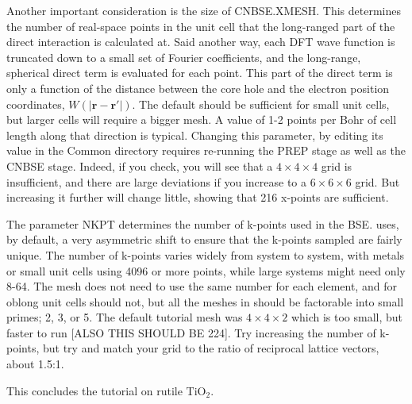 \documentclass[11pt]{report}
\begin{document}
Another important consideration is the size of CNBSE.XMESH. This determines the number of real-space points in the unit cell that the long-ranged part of the direct interaction is calculated at. Said another way, each DFT wave function is truncated down to a small set of Fourier coefficients, and the long-range, spherical direct term is evaluated for each point. This part of the direct term is only a function of the distance between the core hole and the electron position coordinates, $W(|\mathbf{r-r'}|)$. The default should be sufficient for small unit cells, but larger cells will require a bigger mesh. A value of 1-2 points per Bohr of cell length along that direction is typical. 
Changing this parameter, by editing its value in the Common directory requires re-running the PREP stage as well as the CNBSE stage. 
Indeed, if you check, you will see that a $4\times4\times4$ grid is insufficient, and there are large deviations if you increase to a $6\times6\times6$ grid. But increasing it further will change little, showing that 216 x-points are sufficient. 


The parameter NKPT determines the number of k-points used in the BSE.  uses, by default, a very asymmetric shift to ensure that the k-points sampled are fairly unique. The number of k-points varies widely from system to system, with metals or small unit cells using 4096 or more points, while large systems might need only 8-64. The mesh does not need to use the same number for each element, and for oblong unit cells should not, but all the meshes in  should be factorable into small primes; 2, 3, or 5. The default tutorial mesh was $4\times4\times2$ which is too small, but faster to run [ALSO THIS SHOULD BE 224]. Try increasing the number of k-points, but try and match your grid to the ratio of reciprocal lattice vectors, about 1.5:1. 

This concludes the tutorial on rutile TiO$_2$.

\fi
\end{document}
